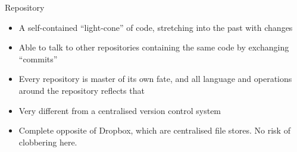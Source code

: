 \documentclass[aspectratio=1610]{beamer} %
\begin{document}
\begin{frame}{Repository}
  
    \begin{itemize}
    \item A self-contained ``light-cone'' of code, stretching into the past with changes
    \item Able to talk to other repositories containing the same code by exchanging ``commits''
    \item Every repository is master of its own fate, and all language and operations around the repository reflects that
    \item Very different from a centralised version control system
    \item Complete opposite of Dropbox, which are centralised file stores. No risk of clobbering here.
  \end{itemize}
\end{frame}


        


%   



%   
\end{document}
